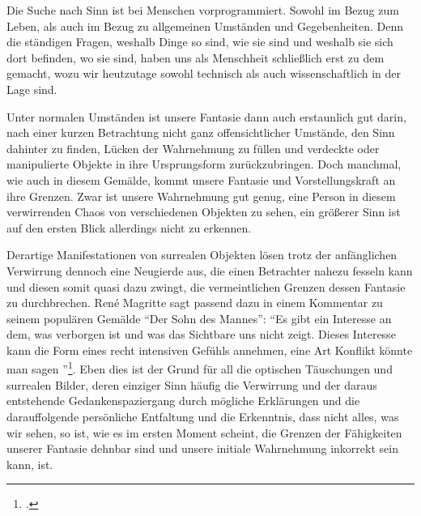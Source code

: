 \documentclass[a4paper, 12pt]{article}
\begin{document}
Die Suche nach Sinn ist bei Menschen vorprogrammiert. Sowohl im Bezug zum Leben, als auch im Bezug zu allgemeinen Umständen und Gegebenheiten. Denn die ständigen Fragen, weshalb Dinge so sind, wie sie sind und weshalb sie sich dort befinden, wo sie sind, haben uns als Menschheit schließlich erst zu dem gemacht, wozu wir heutzutage sowohl technisch als auch wissenschaftlich in der Lage sind.

Unter normalen Umständen ist unsere Fantasie dann auch erstaunlich gut darin, nach einer kurzen Betrachtung nicht ganz offensichtlicher Umstände, den Sinn dahinter zu finden, Lücken der Wahrnehmung zu füllen und verdeckte oder manipulierte Objekte in ihre Ursprungsform zurückzubringen. Doch manchmal, wie auch in diesem Gemälde, kommt unsere Fantasie und Vorstellungskraft an ihre Grenzen. Zwar ist unsere Wahrnehmung gut genug, eine Person in diesem verwirrenden Chaos von verschiedenen Objekten zu sehen, ein größerer Sinn ist auf den ersten Blick allerdings nicht zu erkennen.

Derartige Manifestationen von surrealen Objekten lösen trotz der anfänglichen Verwirrung dennoch eine Neugierde aus, die einen Betrachter nahezu fesseln kann und diesen somit quasi dazu zwingt, die vermeintlichen Grenzen dessen Fantasie zu durchbrechen. René Magritte sagt passend dazu in einem Kommentar zu seinem populären Gemälde \enquote{Der Sohn des Mannes}: \enquote{Es gibt ein Interesse an dem, was verborgen ist und was das Sichtbare uns nicht zeigt. Dieses Interesse kann die Form eines recht intensiven Gefühls annehmen, eine Art Konflikt könnte man sagen \textelp{}}\footcite{sonofman}. Eben dies ist der Grund für all die optischen Täuschungen und surrealen Bilder, deren einziger Sinn häufig die Verwirrung und der daraus entstehende Gedankenspaziergang durch mögliche Erklärungen und die darauffolgende persönliche Entfaltung und die Erkenntnis, dass nicht alles, was wir sehen, so ist, wie es im ersten Moment scheint, die Grenzen der Fähigkeiten unserer Fantasie dehnbar sind und unsere initiale Wahrnehmung inkorrekt sein kann, ist.

%
\end{document}
